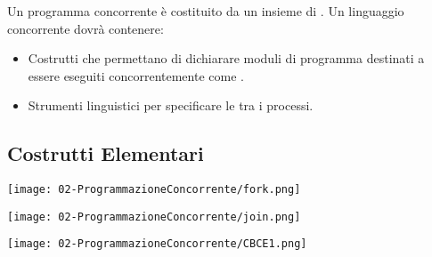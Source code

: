 Un programma concorrente è costituito da un insieme di . Un linguaggio concorrente dovrà contenere: 

\begin{itemize}
  \item Costrutti che permettano di dichiarare moduli di programma destinati a essere eseguiti concorrentemente come . 
  \item Strumenti linguistici per specificare le  tra i processi.
\end{itemize}

\subsection{Costrutti Elementari}

\begin{minipage}{0.45\textwidth}
\end{minipage}
\hfill
\begin{minipage}{0.45\textwidth}
    \begin{center}
        \texttt{[image: 02-ProgrammazioneConcorrente/fork.png]}
    \end{center}
\end{minipage}


\begin{minipage}{0.45\textwidth}
    \begin{center}
        \texttt{[image: 02-ProgrammazioneConcorrente/join.png]}
    \end{center}
\end{minipage}
\hfill
\begin{minipage}{0.45\textwidth}
\end{minipage}



\begin{minipage}{0.5\textwidth}
\end{minipage}
\hfill
\begin{minipage}{0.45\textwidth}
    \begin{center}
        \texttt{[image: 02-ProgrammazioneConcorrente/CBCE1.png]}
    \end{center}
\end{minipage}

